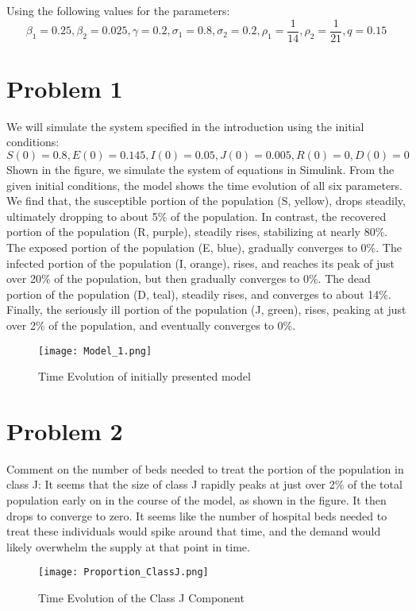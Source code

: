 \documentclass[letterpaper,twocolumn,10pt]{article}
\begin{document}
Using the following values for the parameters:
\[\beta_{1} = 0.25, \beta_{2} = 0.025, \gamma = 0.2, \sigma_{1} = 0.8, \sigma_{2} = 0.2, \rho_{1} = \frac{1}{14}, \rho_{2} = \frac{1}{21}, q = 0.15\]

\section*{Problem 1}
We will simulate the system specified in the introduction using the initial conditions:
\[S(0) = 0.8, E(0) = 0.145, I(0) = 0.05, J(0) = 0.005, R(0) = 0, D(0) = 0\]
Shown in the figure, we simulate the system of equations in Simulink. From the given initial conditions, the model shows the time evolution of all six parameters. We find that, the susceptible portion of the population (S, yellow), drops steadily, ultimately dropping to about 5\% of the population. In contrast, the recovered portion of the population (R, purple), steadily rises, stabilizing at nearly 80\%. The exposed portion of the population (E, blue), gradually converges to 0\%. The infected portion of the population (I, orange), rises, and reaches its peak of just over 20\% of the population, but then gradually converges to 0\%. The dead portion of the population (D, teal), steadily rises, and converges to about 14\%. Finally, the seriously ill portion of the population (J, green), rises, peaking at just over 2\% of the population, and eventually converges to 0\%.

\begin{figure}[t!]
\centering
\texttt{[image: Model\_1.png]}
\caption{Time Evolution of initially presented model \label{fig:Model_1}}
\end{figure}

\section*{Problem 2}
Comment on the number of beds needed to treat the portion of the population in class J: It seems that the size of class J rapidly peaks at just over 2\% of the total population early on in the course of the model, as shown in the figure. It then drops to converge to zero. It seems like the number of hospital beds needed to treat these individuals would spike around that time, and the demand would likely overwhelm the supply at that point in time.

\begin{figure}[b!]
\centering
\texttt{[image: Proportion\_ClassJ.png]}
\caption{Time Evolution of the Class J Component \label{fig:Proportion_ClassJ}}
\end{figure}
\end{document}
